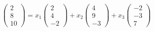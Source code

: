\documentclass[preview]{standalone}
\begin{document}
\begin{align*}
\begin{pmatrix}2\\8\\10\end{pmatrix} = x_1 \begin{pmatrix}2\\4\\-2\end{pmatrix}+ x_2 \begin{pmatrix}4\\9\\-3\end{pmatrix}+ x_3 \begin{pmatrix}-2\\-3\\7\end{pmatrix}
\end{align*}
\end{document}
